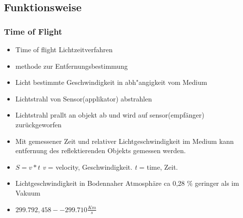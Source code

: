 			\cite{kinect-hacking}
		\subsection{Funktionsweise}
			\subsubsection{Time of Flight}
			\begin{itemize}
			\item Time of flight Lichtzeitverfahren
			\item methode zur Entfernungsbestimmung
			\item Licht bestimmte Geschwindigkeit in abh"angigkeit vom Medium
			\item Lichtstrahl von Sensor(applikator) abstrahlen
			\item Lichtstrahl prallt an objekt ab und wird auf sensor(empfänger) zurückgeworfen
			\item Mit gemessener Zeit und relativer Lichtgeschwindigkeit im Medium kann entfernung des reflektierenden Objekts gemessen werden.
			\item $S=v*t$ \textit{v} = velocity, Geschwindigkeit. \textit{t} = time, Zeit.
			\item Lichtgeschwindigkeit in Bodennaher Atmosphäre ca 0,28 \% geringer als im Vakuum
			\item $299.792,458 -- 299.710 \frac{Km}{s}$ 
			\end{itemize}
